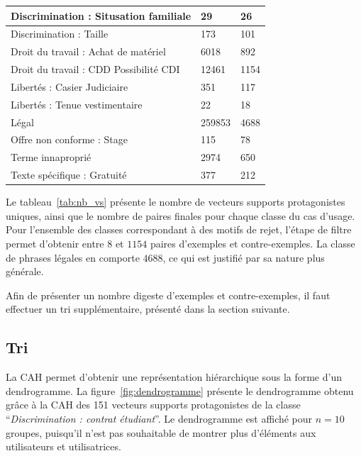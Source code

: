 \begin{table}
\begin{tabular}{|p{}|p{}|p{}|}
            Discrimination : Situsation familiale                  &    29  &  26     \\ \hline
            Discrimination : Taille                                &   173  &  101    \\ \hline
            Droit du travail : Achat de matériel                   &  6018  &  892    \\ \hline
            Droit du travail : CDD Possibilité CDI                 & 12461  &  1154   \\ \hline
            Libertés : Casier Judiciaire                           &   351  &  117    \\ \hline
            Libertés : Tenue vestimentaire                         &    22  &  18     \\ \hline
            Légal                                                  & 259853 &  4688   \\ \hline
            Offre non conforme : Stage                             &   115  &  78     \\ \hline
            Terme innaproprié                                      &  2974  &  650    \\ \hline
            Texte spécifique : Gratuité                            &   377  &  212    \\ \hline
    \end{tabular}
\end{table}

Le tableau~\ref{tab:nb_vs} présente le nombre de vecteurs supports protagonistes uniques, ainsi que le nombre de paires finales pour chaque classe du cas d'usage. Pour l'ensemble des classes correspondant à des motifs de rejet, l'étape de filtre permet d'obtenir entre $8$ et $1 154$ paires d'exemples et contre-exemples. La classe de phrases légales en comporte $4 688$, ce qui est justifié par sa nature plus générale.

Afin de présenter un nombre digeste d'exemples et contre-exemples, il faut effectuer un tri supplémentaire, présenté dans la section suivante.

\subsection{Tri} \label{C4:app_tri}

La CAH permet d'obtenir une représentation hiérarchique sous la forme d'un dendrogramme. La figure~\ref{fig:dendrogramme} présente le dendrogramme obtenu grâce à la  CAH des 151 vecteurs supports protagonistes de la classe ``\textit{Discrimination : contrat étudiant}''. Le dendrogramme est affiché pour $n=10$ groupes, puisqu'il n'est pas souhaitable de montrer plus d'éléments aux utilisateurs et utilisatrices.

